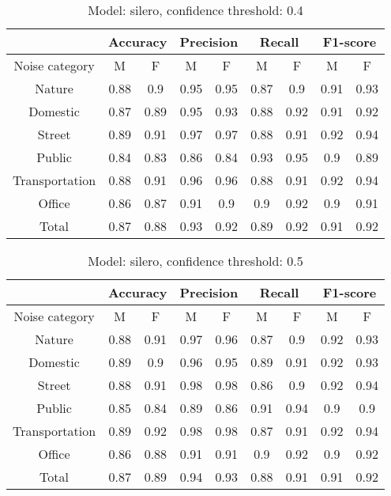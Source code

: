 \documentclass[../main.tex]{subfiles}
\begin{document}
    \begin{table}[H]
    \centering
    \small
    \begin{tabular}{ |c|c|c|c|c|c|c|c|c| }
    \hline
     &\multicolumn{2}{|c|}{Accuracy}&\multicolumn{2}{|c|}{Precision}&\multicolumn{2}{|c|}{Recall}&\multicolumn{2}{|c|}{F1-score} \\ 
    \hline
    Noise category & M & F & M & F & M & F & M & F \\ 
    \hline
    Nature & 0.88 & 0.9 & 0.95 & 0.95 & 0.87 & 0.9 & 0.91 & 0.93 \\ 
    Domestic & 0.87 & 0.89 & 0.95 & 0.93 & 0.88 & 0.92 & 0.91 & 0.92 \\ 
    Street & 0.89 & 0.91 & 0.97 & 0.97 & 0.88 & 0.91 & 0.92 & 0.94 \\ 
    Public & 0.84 & 0.83 & 0.86 & 0.84 & 0.93 & 0.95 & 0.9 & 0.89 \\ 
    Transportation & 0.88 & 0.91 & 0.96 & 0.96 & 0.88 & 0.91 & 0.92 & 0.94 \\ 
    Office & 0.86 & 0.87 & 0.91 & 0.9 & 0.9 & 0.92 & 0.9 & 0.91 \\ 
    Total & 0.87 & 0.88 & 0.93 & 0.92 & 0.89 & 0.92 & 0.91 & 0.92 \\ 
    \hline
    \end{tabular}
    \caption{Model: silero, confidence threshold: 0.4}
    \end{table}
    
    \begin{table}[H]
    \centering
    \small
    \begin{tabular}{ |c|c|c|c|c|c|c|c|c| }
    \hline
     &\multicolumn{2}{|c|}{Accuracy}&\multicolumn{2}{|c|}{Precision}&\multicolumn{2}{|c|}{Recall}&\multicolumn{2}{|c|}{F1-score} \\ 
    \hline
    Noise category & M & F & M & F & M & F & M & F \\ 
    \hline
    Nature & 0.88 & 0.91 & 0.97 & 0.96 & 0.87 & 0.9 & 0.92 & 0.93 \\ 
    Domestic & 0.89 & 0.9 & 0.96 & 0.95 & 0.89 & 0.91 & 0.92 & 0.93 \\ 
    Street & 0.88 & 0.91 & 0.98 & 0.98 & 0.86 & 0.9 & 0.92 & 0.94 \\ 
    Public & 0.85 & 0.84 & 0.89 & 0.86 & 0.91 & 0.94 & 0.9 & 0.9 \\ 
    Transportation & 0.89 & 0.92 & 0.98 & 0.98 & 0.87 & 0.91 & 0.92 & 0.94 \\ 
    Office & 0.86 & 0.88 & 0.91 & 0.91 & 0.9 & 0.92 & 0.9 & 0.92 \\ 
    Total & 0.87 & 0.89 & 0.94 & 0.93 & 0.88 & 0.91 & 0.91 & 0.92 \\ 
    \hline
    \end{tabular}
    \caption{Model: silero, confidence threshold: 0.5}
    \end{table}
    
\end{document}
